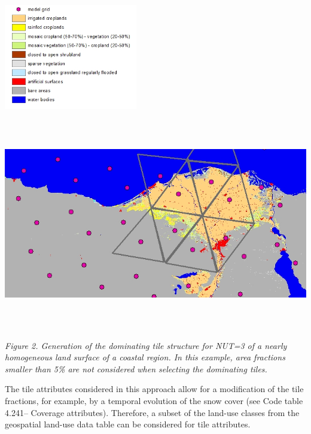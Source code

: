 \includegraphics[width=2.2875in,height=2.02014in]{../tex/extracted-media/media/image12.png}\includegraphics[width=6.94236in,height=3.67222in]{../tex/extracted-media/media/image13.png}

\emph{Figure 2. Generation of the dominating tile structure for NUT=3 of a nearly homogeneous land surface of a coastal region. In this example, area fractions smaller than 5\% are not considered when selecting the dominating tiles.}

The tile attributes considered in this approach allow for a modification of the tile fractions, for example, by a temporal evolution of the snow cover (see Code table 4.241-- Coverage attributes). Therefore, a subset of the land-use classes from the geospatial land-use data table can be considered for tile attributes.

\emph{\\
}

